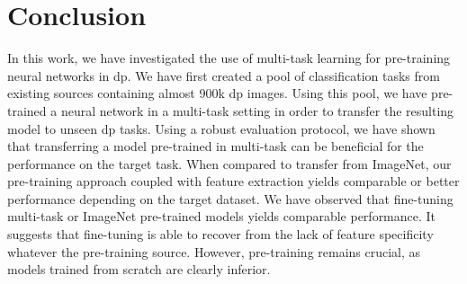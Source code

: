 \section{Conclusion}

In this work, we have investigated the use of multi-task learning for pre-training neural networks in \acrlong{dp}. We have first created a pool of classification tasks from existing sources containing almost 900k \acrlong{dp} images. Using this pool, we have pre-trained a neural network in a multi-task setting in order to transfer the resulting model to unseen \acrlong{dp} tasks. Using a robust evaluation protocol, we have shown that transferring a model pre-trained in multi-task can be beneficial for the performance on the target task. When compared to transfer from ImageNet, our pre-training approach coupled with feature extraction yields comparable or better performance depending on the target dataset. We have observed that fine-tuning multi-task or ImageNet pre-trained models yields comparable performance. It suggests that fine-tuning is able to recover from the lack of feature specificity whatever the pre-training source. However, pre-training remains crucial, as models trained from scratch are clearly inferior. 
